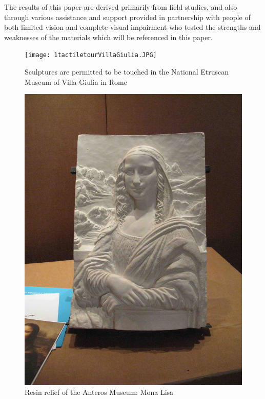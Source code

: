 \documentclass[amsthm,ebook]{saparticle}
\begin{document}
The results of this paper are derived primarily from field studies, and also through various assistance and support
provided in partnership with people of both limited vision and complete visual impairment who tested the strengths and
weaknesses of the materials which will be referenced in this paper.


\begin{figure}[!hbp]
\centering
 \texttt{[image: 1tactiletourVillaGiulia.JPG]}
\caption{Sculptures are permitted to be touched in the National Etruscan Museum of Villa Giulia in Rome}
\label{fig:1}
\end{figure}


\begin{figure}[!hbp]
\centering
 \includegraphics[width=0.9\columnwidth]{2resinreliefMonaLisa.JPG}
\caption{Resin relief of the Anteros Museum: Mona Lisa}
\label{fig:2}
\end{figure}
\end{document}
